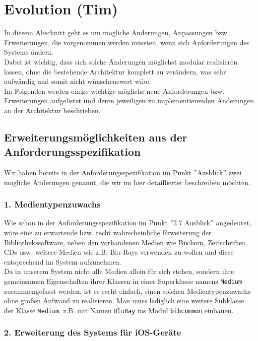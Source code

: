 \documentclass[fontsize=12pt,paper=a4,twoside]{scrartcl}
\begin{document}
\section{Evolution (Tim)}


\label{sec:evolution}

In diesem Abschnitt geht es um mögliche Änderungen, Anpassungen bzw. Erweiterungen, die vorgenommen werden müssten, wenn sich Anforderungen des Systems ändern. \\
Dabei ist wichtig, dass sich solche Änderungen möglichst modular realisieren lassen, ohne die bestehende Architektur komplett zu verändern, was sehr aufwändig und somit nicht wünschenswert wäre. \\
Im Folgenden werden einige wichtige mögliche neue Anforderungen bzw. Erweiterungen aufgelistet und deren jeweiligen zu implementierenden Änderungen an der Architektur beschrieben. 

\subsection*{Erweiterungsmöglichkeiten aus der Anforderungsspezifikation}

Wir haben bereits in der Anforderungsspezifikation im Punkt ''Ausblick'' zwei mögliche Änderungen genannt, die wir im hier detaillierter beschreiben möchten. 

\subsubsection*{1. Medientypenzuwachs}

Wie schon in der Anforderungsspezifikation im Punkt ''2.7 Ausblick'' angedeutet, wäre eine zu erwartende bzw. recht wahrscheinliche Erweiterung der Bibliothekssoftware, neben den vorhandenen Medien wie Büchern, Zeitschriften, CDs usw. weitere Medien wie z.B. Blu-Rays verwenden zu wollen und diese entsprechend im System aufzunehmen.\\
Da in unserem System nicht alle Medien allein für sich stehen, sondern ihre gemeinsamen Eigenschaften ihrer Klassen in einer Superklasse namens \texttt{Medium} zusammengefasst werden, ist es recht einfach, einen solchen Medientypenzuwachs ohne großen Aufwand zu realisieren. Man muss lediglich eine weitere Subklasse der Klasse \texttt{Medium}, z.B. mit Namen \texttt{BluRay} ins Modul \texttt{bibcommon} einbauen.

\subsubsection*{2. Erweiterung des Systems für iOS-Geräte}
\end{document}
